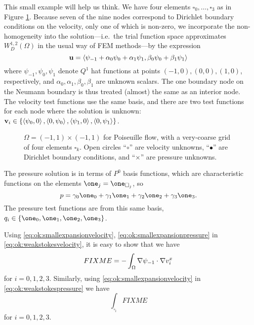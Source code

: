 This small example will help us think.  We have four elements $\square_0,\dots,\square_3$ as in Figure \ref{fig:ok:poiseuille}.  Because seven of the nine nodes correspond to Dirichlet boundary conditions on the velocity, only one of which is non-zero, we incorporate the non-homogeneity into the solution---i.e.~the trial function space approximates $W_D^{1,2}(\Omega)$ in the usual way of FEM methods---by the expression
\begin{equation}
\mathbf{u} = \left<\psi_{-1}+\alpha_0\psi_0+\alpha_1\psi_1,\beta_0\psi_0+\beta_1\psi_1\right>  \label{eq:ok:smallexpansionvelocity}
\end{equation}
where $\psi_{-1},\psi_0,\psi_1$ denote $Q^1$ hat functions at points $(-1,0),(0,0),(1,0)$, respectively, and $\alpha_0,\alpha_1,\beta_0,\beta_1$ are unknown scalars.  The one boundary node on the Neumann boundary is thus treated (almost) the same as an interior node.  The velocity test functions use the same basis, and there are two test functions for each node where the solution is unknown: $\mathbf{v}_i \in \left\{\left<\psi_0,0\right>, \left<0,\psi_0\right>, \left<\psi_1,0\right>, \left<0,\psi_1\right>\right\}$.

\begin{figure}

\caption{$\Omega=(-1,1)\times(-1,1)$ for Poiseuille flow, with a very-coarse grid of four elements $\square_k$.  Open circles ``{\large $\circ$}'' are velocity unknowns, ``$\bullet$'' are Dirichlet boundary conditions, and ``$\times$'' are pressure unknowns.}
\label{fig:ok:poiseuille}
\end{figure}

The pressure solution is in terms of $P^0$ basis functions, which are characteristic functions on the elements $\one_j = \one_{\square_j}$, so
\begin{equation}
p = \gamma_0 \one_0 + \gamma_1 \one_1 + \gamma_2 \one_2 + \gamma_3 \one_3.  \label{eq:ok:smallexpansionpressure}
\end{equation}
The pressure test functions are from this same basis, $q_i \in \{\one_0,\one_1,\one_2,\one_3\}$.

Using \eqref{eq:ok:smallexpansionvelocity}, \eqref{eq:ok:smallexpansionpressure} in \eqref{eq:ok:weakstokesvelocity}, it is easy to show that we have
\begin{equation}
FIXME = - \int_\Omega \nabla \psi_{-1} \cdot \nabla v_i^x
\end{equation}
for $i=0,1,2,3$.  Similarly, using \eqref{eq:ok:smallexpansionvelocity} in \eqref{eq:ok:weakstokespressure} we have
\begin{equation}
\int_{\square_i} FIXME
\end{equation}
for $i=0,1,2,3$.


